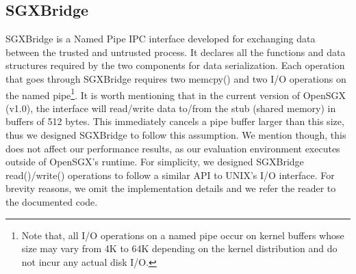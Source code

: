 \documentclass[../main.tex]{subfiles}
\begin{document}


%

\subsection{SGXBridge}
\label{subsec:sgxbridge}

SGXBridge is a Named Pipe IPC interface developed for exchanging data between
the trusted and untrusted process. It declares all the functions and data
structures required by the two components for data serialization. Each operation
that goes through SGXBridge requires two memcpy() and two I/O operations on the
named pipe\footnote{Note that, all I/O operations on a named pipe occur on
kernel buffers whose size may vary from 4K to 64K depending on the kernel
distribution and do not incur any actual disk I/O.}. It is worth mentioning
that in the current version of OpenSGX (v1.0), the interface will read/write
data to/from the stub (shared memory) in buffers of 512 bytes. This immediately
cancels a pipe buffer larger than this size, thus we designed SGXBridge to
follow this assumption. We mention though, this does not affect our performance
results, as our evaluation environment executes outside of OpenSGX's
runtime. For simplicity, we designed SGXBridge read()/write() operations to
follow a similar API to UNIX's I/O interface. For brevity reasons, we omit the
implementation details and we refer the reader to the documented code.
\end{document}
